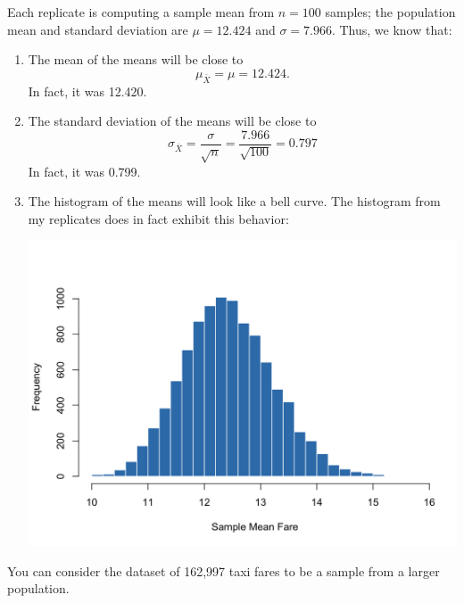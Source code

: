 \documentclass[answers,11pt]{exam}
\begin{document}
\begin{questions}
\begin{solution}
  Each replicate is computing a sample mean from $n = 100$ samples; the
  population mean and standard deviation are $\mu = 12.424$ and $\sigma =
  7.966$. Thus, we know that:

  \begin{enumerate}
    \item The mean of the means will be close to
      \[
        \mu_{\bar X} = \mu = 12.424.
      \]
      In fact, it was 12.420.

    \item The standard deviation of the means will be close to
      \[
        \sigma_{\bar X} = \frac{\sigma}{\sqrt{n}} = \frac{7.966}{\sqrt{100}} = 0.797
      \]
      In fact, it was 0.799.

    \item The histogram of the means will look like a bell curve.
      The histogram from my replicates does in fact exhibit this behavior:

      \includegraphics[width=\linewidth]{sampmean.png}

  \end{enumerate}

\end{solution}

\vfill

\newpage

\question You can consider the dataset of 162,997 taxi fares to be a sample
from a larger population. 


\end{questions}
\end{document}
